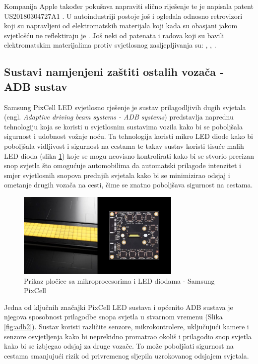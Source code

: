 \documentclass{foi}
\begin{document}
Kompanija Apple također pokušava napraviti slično riješenje te je napisala patent \newline US20180304727A1 \cite{OwenMal2018} \cite{Apple2016}. U autoindustriji postoje još i ogledala odnosno retrovizori koji su napravljeni od elektromatskih materijala koji kada su obasjani jakom svjetlošću ne reflektiraju je \cite{Autoevolution2022}. Još neki od patenata i radova koji su bavili elektromatskim materijalima protiv svjetlosnog zasljepljivanja su: \cite{KumarB2020}, \cite{Dewayne}, \cite{Yuter2010}.

\subsection{Sustavi namjenjeni zaštiti ostalih vozača - ADB sustav}

Samsung PixCell LED svjetlosno rješenje je sustav prilagodljivih dugih svjetala (engl. \emph{Adaptive driving beam systems - ADB systems}) predstavlja naprednu tehnologiju koja se koristi u svjetlosnim sustavima vozila kako bi se poboljšala sigurnost i udobnost vožnje noću. Ta tehnologija koristi mikro LED diode kako bi poboljšala vidljivost i sigurnost na cestama te takav sustav koristi tisuće malih LED dioda (slika \ref{fig:adb}) koje se mogu neovisno kontrolirati kako bi se stvorio precizan snop svjetla što omogućuje automobilima da automatski prilagode intenzitet i smjer svjetlosnih snopova prednjih svjetala kako bi se minimizirao odsjaj i ometanje drugih vozača na cesti, čime se znatno poboljšava sigurnost na cestama. \cite{Samsung2021}

\begin{figure}[h!]
    \centering
    \includegraphics[width=0.7\textwidth]{slike/adb}
    \caption{Prikaz pločice sa mikroprocesorima i LED diodama - Samsung PixCell \cite{Samsung2021}}
    \label{fig:adb}
\end{figure}

Jedna od ključnih značajki PixCell LED sustava i općenito ADB sustava je njegova sposobnost prilagodbe snopa svjetla u stvarnom vremenu (Slika \ref{fig:adb2}). Sustav koristi različite senzore, mikrokontrolere, uključujući kamere i senzore osvjetljenja kako bi neprekidno promatrao okoliš i prilagodio snop svjetla kako bi se izbjegao odsjaj za druge vozače. To može poboljšati sigurnost na cestama smanjujući rizik od privremenog sljepila uzrokovanog odsjajem svjetala. \cite{Samsung2021}
\end{document}
